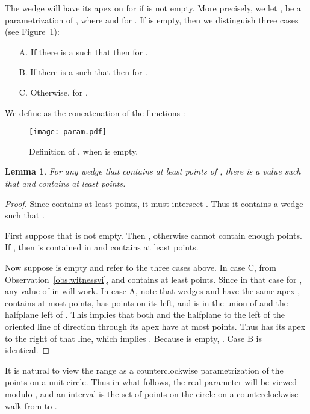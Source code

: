 \documentclass[english,11pt]{article}
\newtheorem{lemma}{Lemma}
\begin{document}
The wedge  will have its apex on  for  if  is not empty.
More precisely, we let ,  be a parametrization of , 
where  and 
 for .
If  is empty, then we distinguish three cases (see Figure~\ref{fig:param}):
\begin{itemize}
\item [A.] If there is a  such that  then 
   for .
\item [B.] If there is a  such that  then 
   for .
\item [C.] Otherwise,  for .
\end{itemize}
We define  as the concatenation of the functions :


\begin{figure}[htb]
\begin{center}
\texttt{[image: param.pdf]}
\end{center}
\caption{\label{fig:param}Definition of , when  is empty.}
\end{figure}

\begin{lemma}
\label{lem:witnesses}
For any wedge  that contains at least  points of ,
there is a value  such that 
and  contains at least  points.
\end{lemma}
\begin{proof}
Since  contains at least  points, it must intersect . Thus it contains a wedge
 such that . 

First suppose that  is not empty. Then , otherwise
 cannot contain enough points. 
If , then 
is contained in  and contains at least  points. 

Now suppose  is empty and refer to the three cases above. 
In case C, from Observation~\ref{obs:witnessvi},  and
 contains at least  points. Since in that case  for , any value of  in  will work. 
In case A, note that  wedges  and  have the same apex 
,  contains at most  points,
 has  points on its left, and  is in the
union of  and the halfplane left of .
This implies that both  and the halfplane to the left of the oriented
line of direction  through its apex have at most 
points. Thus  has its apex to the right
of that line, which implies . 
Because  is empty, .
Case B is identical.
\end{proof}

It is natural to view the range  as a counterclockwise
parametrization of the points on a unit circle. Thus in what follows,
the real parameter  will be viewed modulo , and an interval
 is the set of points on the circle on a counterclockwise walk
from  to . 
\end{document}
